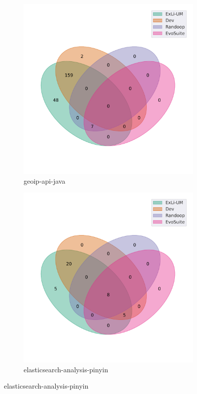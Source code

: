\begin{figure}[t]\ContinuedFloat
\begin{subfigure}[b]{0.45\textwidth}
\includegraphics[width=\textwidth]{figures/venn/maxmind_geoip-api-java-venn.pdf}
\vspace{-10pt}
\caption{geoip-api-java}
\label{fig:venn-maxmind_geoip-api-java}
\end{subfigure}
\hfill
\begin{subfigure}[b]{0.45\textwidth}
\includegraphics[width=\textwidth]{figures/venn/medcl_elasticsearch-analysis-pinyin-venn.pdf}
\vspace{-10pt}
\caption{elasticsearch-analysis-pinyin}
\label{fig:venn-medcl_elasticsearch-analysis-pinyin}
\end{subfigure}
\end{figure}
